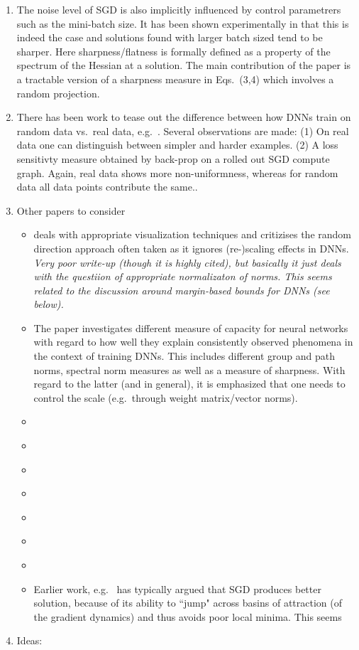 \documentclass[10pt,a4paper]{article}
\begin{document}
\begin{enumerate}
\begin{itemize}
\end{itemize}
\item The noise level of SGD is also implicitly influenced by control parametrers such as the mini-batch size. It has been shown experimentally in 
\cite{keskar2016large} that this is indeed the case and solutions found with larger batch sized tend to be sharper. Here sharpness/flatness is formally defined as a property of the spectrum of the Hessian at a solution. The main contribution of the paper is a tractable version of a sharpness measure in Eqs.~(3,4) which involves a random projection.
\item There has been work to tease out the difference between how DNNs train on random data vs.~real data, e.g.~\cite{arpit2017closer}. Several observations are made: (1) On real data one can distinguish between simpler and harder examples. (2) A loss sensitivty measure obtained by back-prop on a rolled out SGD compute graph. Again, real data shows more non-uniformness, whereas for random data all data points contribute the same.. 

\newpage
\item Other papers to consider 
\begin{itemize}
\item \cite{li2018visualizing} deals with appropriate visualization techniques and critizises the random direction approach often  taken as it ignores (re-)scaling effects in DNNs. \textit{Very poor write-up (though it is highly cited), but basically it just deals with the  questiion of  appropriate normalizaton of norms. This seems related to the discussion around margin-based bounds for DNNs (see below).} 
\item \cite{neyshabur2017exploring}
The paper investigates different measure of capacity for neural networks with regard to how well they explain consistently observed phenomena in the context of training DNNs. This includes different group and path norms,  spectral norm measures as well as a measure of sharpness. With regard to the latter (and in general), it is emphasized that one needs to control the scale (e.g.~through weight matrix/vector norms).
\item \cite{kawaguchi2017generalization}
\item \cite{brutzkus2017sgd}
\item \cite{golowich2017size}
\item \cite{du2018power}
\item \cite{soudry2017exponentially}
\item \cite{arora2019fine}
\item \cite{zhu2018bayesian}
\item Earlier work, e.g.~\cite{lecun2012efficient} has typically argued that SGD produces better solution, because of its ability to ``jump" across basins of attraction (of the gradient dynamics) and thus avoids poor local minima. This seems
\end{itemize}
\item Ideas: 
\end{enumerate}



\end{document}
